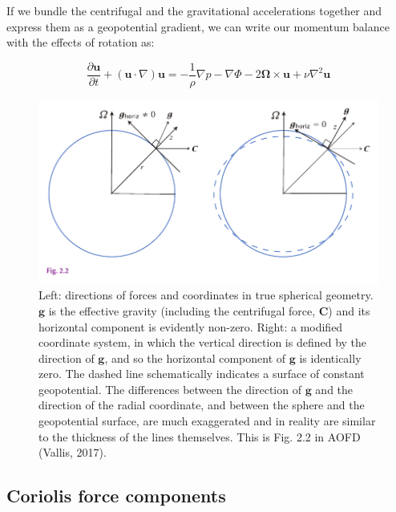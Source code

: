 \documentclass[12pt]{article}
\numberwithin{equation}{section}
\numberwithin{figure}{section}
\numberwithin{table}{section}
\begin{document}
If we bundle the centrifugal and the gravitational accelerations together and
express them as a geopotential gradient, we can write our momentum balance with
the effects of rotation as:

\begin{equation}
  \frac{\partial \mathbf{u}}{\partial t} +
  \left( \mathbf{u} \cdot \nabla \right) \mathbf{u} =
  - \frac{1}{\rho} \nabla p
  - \nabla \Phi
  - 2 \mathbf{\Omega} \times \mathbf{u}
  + \nu \nabla^2 \mathbf{u}
  \label{eq:momentum_navier_stokes_rotating}
\end{equation}

\begin{figure}[h]
  \centering
  \includegraphics[width=\textwidth]{assets/fig_centrifugal_force.pdf}
  \caption{
    Left: directions of forces and coordinates in true spherical geometry.
    $\mathbf{g}$ is the effective gravity (including the centrifugal force, $\mathbf{C}$)
    and its horizontal component is evidently non-zero.
    Right: a modified coordinate system, in which the vertical direction is
    defined by the direction of $\mathbf{g}$, and so the horizontal component
    of $\mathbf{g}$ is identically zero. The dashed line schematically indicates
    a surface of constant geopotential.
    The differences between the direction of $\mathbf{g}$ and the direction of
    the radial coordinate, and between the sphere and the geopotential surface,
    are much exaggerated and in reality are similar to the thickness of the
    lines themselves.
    This is Fig. 2.2 in AOFD (Vallis, 2017).
  }
  \label{fig:centrifugal_force}
\end{figure}

\subsection{Coriolis force components}
\end{document}
